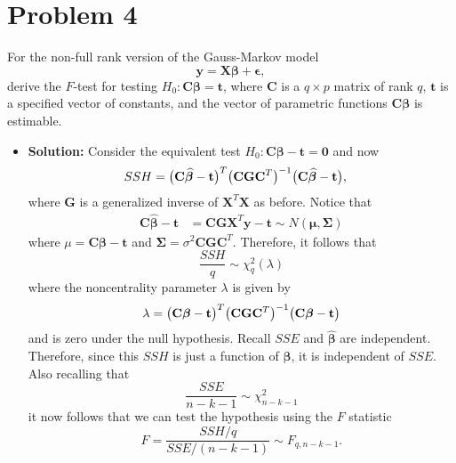 \documentclass[11pt]{article}
\begin{document}
\section*{Problem 4}
For the non-full rank version of the Gauss-Markov model
\[
\mathbf{y} = \mathbf{X}\bm\beta + \bm\epsilon,
\]
derive the $F$-test for testing $H_0\colon\mathbf{C}\bm\beta = \mathbf{t}$, where $\mathbf{C}$ is a $q\times p$ matrix of rank $q$, $\mathbf{t}$ is a specified vector of constants, and the vector of parametric functions $\mathbf{C}\bm\beta$ is estimable.
\begin{itemize}
\item[] \textbf{Solution:}  Consider the equivalent test $H_0\colon \mathbf{C}\bm\beta - \mathbf{t} = \mathbf{0}$ and now
\begin{align*}
SSH &= \big{(}\mathbf{C}\widehat{\bm\beta} - \mathbf{t}\big{)}^T\big{(}\mathbf{C}\mathbf{G}\mathbf{C}^T\big{)}^{-1}\big{(}\mathbf{C}\widehat{\bm\beta}  - \mathbf{t}\big{)},
\end{align*}
where $\mathbf{G}$ is a generalized inverse of $\mathbf{X}^T\mathbf{X}$ as before.  Notice that 
\begin{align*}
\mathbf{C}\widehat{\bm\beta} - \mathbf{t} &= \mathbf{C}\mathbf{G}\mathbf{X}^T\mathbf{y} - \mathbf{t} \sim N(\bm\mu, \bm\Sigma)
\end{align*}
where $\mu = \mathbf{C}\bm\beta - \mathbf{t}$ and $\bm\Sigma = \sigma^2\mathbf{C}\mathbf{G}\mathbf{C}^T$.  Therefore, it follows that
\[
\frac{SSH}{q} \sim \chi^2_q(\lambda)
\]
where the noncentrality parameter $\lambda$ is given by
\[
\lambda = \big{(}\mathbf{C}\bm\beta - \mathbf{t}\big{)}^T\big{(}\mathbf{C}\mathbf{G}\mathbf{C}^T\big{)}^{-1}\big{(}\mathbf{C}\bm\beta - \mathbf{t}\big{)}
\]
and is zero under the null hypothesis.  Recall $SSE$ and $\widehat{\bm\beta}$ are independent.  Therefore, since this $SSH$ is just a function of $\widehat{\bm\beta}$, it is independent of $SSE$.  Also recalling that
\[
\frac{SSE}{n-k-1}\sim\chi^2_{n-k-1}
\] 
it now follows that we can test the hypothesis using the $F$ statistic
\[
F = \frac{SSH/q}{SSE/(n-k-1)} \sim F_{q,n-k-1}.
\]
\end{itemize}
\end{document}
